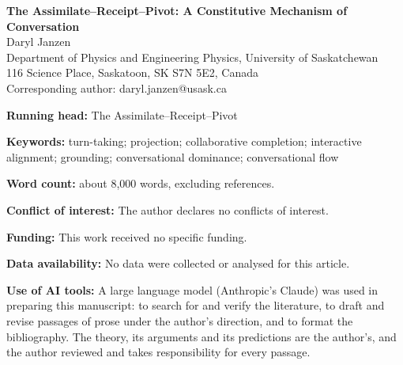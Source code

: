 \documentclass[11pt,letterpaper]{article}
\begin{document}
\thispagestyle{empty}
\begin{center}
{\large\bfseries The Assimilate--Receipt--Pivot: A Constitutive Mechanism of Conversation}\\[2em]
Daryl Janzen\\[0.5em]
Department of Physics and Engineering Physics, University of Saskatchewan\\
116 Science Place, Saskatoon, SK S7N 5E2, Canada\\[0.5em]
Corresponding author: daryl.janzen@usask.ca
\end{center}
\vspace{2em}
\noindent\textbf{Running head:} The Assimilate--Receipt--Pivot

\medskip
\noindent\textbf{Keywords:} turn-taking; projection; collaborative completion; interactive alignment; grounding; conversational dominance; conversational flow

\medskip
\noindent\textbf{Word count:} about 8,000 words, excluding references.

\medskip
\noindent\textbf{Conflict of interest:} The author declares no conflicts of interest.

\medskip
\noindent\textbf{Funding:} This work received no specific funding.

\medskip
\noindent\textbf{Data availability:} No data were collected or analysed for this article.

\medskip
\noindent\textbf{Use of AI tools:} A large language model (Anthropic's Claude) was used in preparing this manuscript: to search for and verify the literature, to draft and revise passages of prose under the author's direction, and to format the bibliography. The theory, its arguments and its predictions are the author's, and the author reviewed and takes responsibility for every passage.
\end{document}
